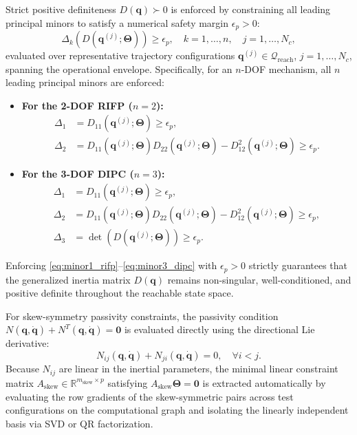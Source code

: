 \documentclass[lettersize,journal]{IEEEtran}
\begin{document}
Strict positive definiteness $D(\bm{q}) \succ 0$ is enforced by constraining all leading principal minors to satisfy a numerical safety margin $\epsilon_p > 0$:
\begin{equation}
    \Delta_k(D(\bm{q}^{(j)}; \bm{\Theta})) \ge \epsilon_p, \quad k = 1, \dots, n, \quad j = 1, \dots, N_c,
    \label{eq:principal_minors_gen}
\end{equation}
evaluated over representative trajectory configurations $\bm{q}^{(j)} \in \mathcal{Q}_{\text{reach}}$, $j = 1, \dots, N_c$, spanning the operational envelope. Specifically, for an $n$-DOF mechanism, all $n$ leading principal minors are enforced:
\begin{itemize}
    \item \textbf{For the 2-DOF RIFP ($n=2$):}
    \begin{align}
        \Delta_1 &= D_{11}(\bm{q}^{(j)}; \bm{\Theta}) \ge \epsilon_p, \label{eq:minor1_rifp} \\
        \Delta_2 &= D_{11}(\bm{q}^{(j)}; \bm{\Theta}) D_{22}(\bm{q}^{(j)}; \bm{\Theta}) - D_{12}^2(\bm{q}^{(j)}; \bm{\Theta}) \ge \epsilon_p. \label{eq:minor2_rifp}
    \end{align}
    \item \textbf{For the 3-DOF DIPC ($n=3$):}
    \begin{align}
        \Delta_1 &= D_{11}(\bm{q}^{(j)}; \bm{\Theta}) \ge \epsilon_p, \label{eq:minor1_dipc} \\
        \Delta_2 &= D_{11}(\bm{q}^{(j)}; \bm{\Theta}) D_{22}(\bm{q}^{(j)}; \bm{\Theta}) - D_{12}^2(\bm{q}^{(j)}; \bm{\Theta}) \ge \epsilon_p, \label{eq:minor2_dipc} \\
        \Delta_3 &= \det(D(\bm{q}^{(j)}; \bm{\Theta})) \ge \epsilon_p. \label{eq:minor3_dipc}
    \end{align}
\end{itemize}
Enforcing \eqref{eq:minor1_rifp}--\eqref{eq:minor3_dipc} with $\epsilon_p > 0$ strictly guarantees that the generalized inertia matrix $D(\bm{q})$ remains non-singular, well-conditioned, and positive definite throughout the reachable state space.

For skew-symmetry passivity constraints, the passivity condition $N(\bm{q}, \dot{\bm{q}}) + N^T(\bm{q}, \dot{\bm{q}}) = \mathbf{0}$ is evaluated directly using the directional Lie derivative:
\begin{equation}
    N_{ij}(\bm{q}, \dot{\bm{q}}) + N_{ji}(\bm{q}, \dot{\bm{q}}) = 0, \quad \forall i < j.
\end{equation}
Because $N_{ij}$ are linear in the inertial parameters, the minimal linear constraint matrix $A_{\mathrm{skew}} \in \mathbb{R}^{m_{\mathrm{skew}} \times p}$ satisfying $A_{\mathrm{skew}} \bm{\Theta} = \mathbf{0}$ is extracted automatically by evaluating the row gradients of the skew-symmetric pairs across test configurations on the computational graph and isolating the linearly independent basis via SVD or QR factorization.
\end{document}

